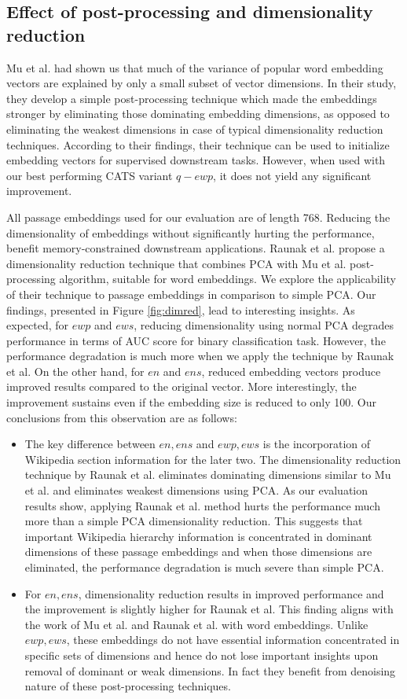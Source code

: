 \documentclass[sigconf,authordraft]{acmart}
\begin{document}
\subsection{Effect of post-processing and dimensionality reduction} Mu et al. had shown us that much of the variance of popular word embedding vectors are explained by only a small subset of vector dimensions. In their study, they develop a simple post-processing technique which made the embeddings stronger by eliminating those dominating embedding dimensions, as opposed to eliminating the weakest dimensions in case of typical dimensionality reduction techniques. According to their findings, their technique can be used to initialize embedding vectors for supervised downstream tasks. However, when used with our best performing CATS variant $q-ewp$, it does not yield any significant improvement.

All passage embeddings used for our evaluation are of length 768. Reducing the dimensionality of embeddings without significantly hurting the performance, benefit memory-constrained downstream applications. Raunak et al. propose a dimensionality reduction technique that combines PCA with Mu et al. post-processing algorithm, suitable for word embeddings. We explore the applicability of their technique to passage embeddings in comparison to simple PCA. Our findings, presented in Figure \ref{fig:dimred}, lead to interesting insights. As expected, for $ewp$ and $ews$, reducing dimensionality using normal PCA degrades performance in terms of AUC score for binary classification task. However, the performance degradation is much more when we apply the technique by Raunak et al. On the other hand, for $en$ and $ens$, reduced embedding vectors produce improved results compared to the original vector. More interestingly, the improvement sustains even if the embedding size is reduced to only 100. Our conclusions from this observation are as follows:
\begin{itemize}
    \item The key difference between $en, ens$ and $ewp, ews$ is the incorporation of Wikipedia section information for the later two. The dimensionality reduction technique by Raunak et al. eliminates dominating dimensions similar to Mu et al. and eliminates weakest dimensions using PCA. As our evaluation results show, applying Raunak et al. method hurts the performance much more than a simple PCA dimensionality reduction. This suggests that important Wikipedia hierarchy information is concentrated in dominant dimensions of these passage embeddings and when those dimensions are eliminated, the performance degradation is much severe than simple PCA.
    \item For $en, ens$, dimensionality reduction results in improved performance and the improvement is slightly higher for Raunak et al. This finding aligns with the work of Mu et al. and Raunak et al. with word embeddings. Unlike $ewp, ews$, these embeddings do not have essential information concentrated in specific sets of dimensions and hence do not lose important insights upon removal of dominant or weak dimensions. In fact they benefit from denoising nature of these post-processing techniques.
\end{itemize}
\end{document}
